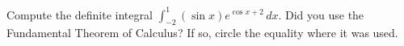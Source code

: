 Compute the definite integral $\displaystyle \int_{-2}^1 (\sin x) e^{\cos x + 2}\,dx$.  Did you use the Fundamental Theorem of Calculus?  If so, circle the equality where it was used.